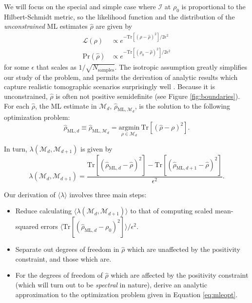 \documentclass[aps,pra, twocolumn]{revtex4-1}
\newcommand{\M}{\mathcal{M}}
\newcommand{\cL}{\mathcal{L}}
\newcommand{\Fi}{\mathcal{I}}
\newcommand{\rhohat}{\hat{\rho}}
\newcommand{\rhoML}[1]{\rhohat_{\scriptscriptstyle{\mathrm{ML},#1}}}
\begin{document}
We will focus on the special and simple case where $\Fi$ at $\rho_{0}$ is  proportional to the Hilbert-Schmidt metric, so the likelihood function and the distribution of the \emph{unconstrained} ML estimates $\rhohat$ are given by 
\begin{align}
\label{eq:likelihood}
\cL(\rho) & \propto e^{-\mathrm{Tr}[(\rho - \rhohat)^{2}]/2\epsilon^{2}}\\
\mathrm{Pr}(\rhohat) &\propto e^{-\mathrm{Tr}[(\rho_{0} - \rhohat)^{2}]/2\epsilon^{2}}
\end{align}
for some $\epsilon$ that scales as $1 / \sqrt{N_{\mathrm{samples}}}$.  The isotropic assumption greatly simplifies our study of the problem, and permits the derivation of analytic results which capture realistic tomographic scenarios surprisingly well \cite{Smolin2012}. 
Because it is unconstrained, $\rhohat$ is often not positive semidefinite (see Figure \ref{fig:boundaries}). For each $\rhohat$, the ML estimate in $\M_{d}$, $\rhoML{\M_{d}}$, is the solution to the following optimization problem:
\begin{equation}
\label{eq:mleopt}
\rhoML{d} \equiv \rhoML{\M_{d}} = \underset{\rho \in \M_{d}}{\mathrm{argmin}}~\mathrm{Tr}[(\rhohat - \rho)^{2}].
\end{equation}

In turn, $\lambda(\M_{d}, \M_{d+1})$ is given by
\begin{equation}
\label{eq:llrs}
\lambda(\M_{d}, \M_{d+1}) = \frac{\mathrm{Tr}[(\rhoML{d}  - \rhohat)^{2}] - \mathrm{Tr}[(\rhoML{d+1} - \rhohat)^{2}]}{\epsilon^{2}}.
\end{equation}

Our derivation of $\langle \lambda \rangle$ involves three main steps:
\begin{itemize}
\item Reduce calculating $\langle \lambda(\M_{d}, \M_{d+1})\rangle$ to that of computing scaled mean-squared errors $\langle \mathrm{Tr}[(\rhoML{d} - \rho_{0})^{2}]\rangle/\epsilon^{2}$.
\item Separate out degrees of freedom in $\rhohat$ which are unaffected by the positivity constraint, and those which are.
\item For the degrees of freedom of $\rhohat$ which are affected by the positivity constraint (which will turn out to be \emph{spectral} in nature), derive an analytic approximation to the optimization problem given in Equation \eqref{eq:mleopt}.
\end{itemize}
\end{document}
